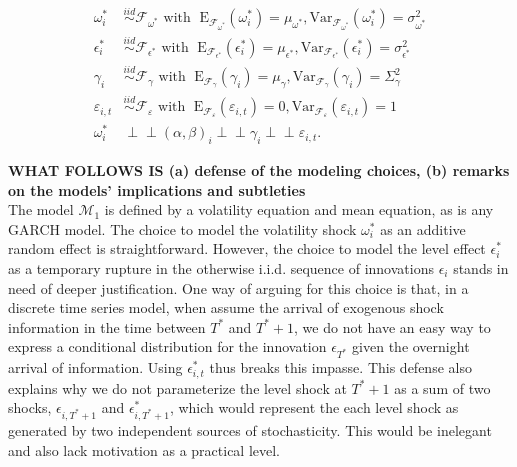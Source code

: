 \documentclass[11pt]{article}
\newcommand{\simiid}{\stackrel{iid}{\sim}} %
\newcommand{\indep}{\perp \!\!\! \perp } %
\def\mrm#1{\mathrm{#1}} %
\def\mc#1{\mathcal{#1}} %
\def\mc#1{\mathcal{#1}}
\theoremstyle{definition}
\begin{document}
\begin{align*}
\omega^{*}_i &\simiid \mc{F}_{\omega^{*}} \text{ with }  \; \mrm{E}_{\mc{F}_{\omega^{*}}}(\omega^{*}_i) = \mu_{\omega^{*}}, \mrm{Var}_{\mc{F}_{\omega^{*}}}(\omega^{*}_i)  = \sigma^2_{\omega^{*}}  \\
\epsilon^{*}_i &\simiid \mc{F}_{\epsilon^{*}} \text{ with }  \; \mrm{E}_{\mc{F}_{\epsilon^{*}}}(\epsilon^{*}_i) = \mu_{\epsilon^{*}}, \mrm{Var}_{\mc{F}_{\epsilon^{*}}}(\epsilon^{*}_i)  = \sigma^2_{\epsilon^{*}}  \\
   \gamma_i &\simiid \mc{F}_{\gamma} \text{ with }  \; \mrm{E}_{\mc{F}_{\gamma}}(\gamma_i) = \mu_{\gamma}, \mrm{Var}_{\mc{F}_{\gamma}}(\gamma_i)  = \Sigma^2_{\gamma} \\
\varepsilon_{i,t} & \simiid  \mc{F}_{\varepsilon} \text{ with }  \; \mrm{E}_{\mc{F}_{\varepsilon}}(\varepsilon_{i,t}) = 0, \mrm{Var}_{\mc{F}_{\varepsilon}}(\varepsilon_{i,t})  = 1 \\
\omega^{*}_i &\indep  (\alpha, \beta)_i \indep \gamma_i \indep \varepsilon_{i,t}.
\end{align*}

\textbf{WHAT FOLLOWS IS (a) defense of the modeling choices, (b) remarks on the models' implications and subtleties}\\

The model $\mc{M}_1$ is defined by a volatility equation and mean equation, as is any GARCH model.  The choice to model the volatility shock $\omega^{*}_{i}$ as an additive random effect is straightforward.  However, the choice to model the level effect $\epsilon^{*}_{i}$ as a temporary rupture in the otherwise i.i.d. sequence of innovations $\epsilon_{i}$ stands in need of deeper justification.  One way of arguing for this choice is that, in a discrete time series model, when assume the arrival of exogenous shock information in the time between $T^{*}$ and $T^{*}+1$, we do not have an easy way to express a conditional distribution for the innovation $\epsilon_{T^{*}}$ given the overnight arrival of information.  Using $\epsilon^{*}_{i,t}$ thus breaks this impasse.  This defense also explains why we do not parameterize the level shock at $T^{*}+1$ as a sum of two shocks, $\epsilon_{i,T^{*}+1}$ and $\epsilon^{*}_{i,T^{*}+1}$, which would represent the each level shock as generated by two independent sources of stochasticity.  This would be inelegant and also lack motivation as a practical level.
\end{document}

